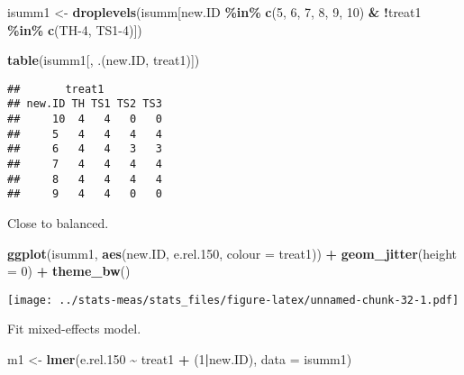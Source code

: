 \documentclass[
]{article}
\newenvironment{Shaded}{\begin{snugshade}}{\end{snugshade}}
\newcommand{\AttributeTok}[1]{\textcolor[rgb]{0.13,0.29,0.53}{#1}}
\newcommand{\DecValTok}[1]{\textcolor[rgb]{0.00,0.00,0.81}{#1}}
\newcommand{\FloatTok}[1]{\textcolor[rgb]{0.00,0.00,0.81}{#1}}
\newcommand{\FunctionTok}[1]{\textcolor[rgb]{0.13,0.29,0.53}{\textbf{#1}}}
\newcommand{\NormalTok}[1]{#1}
\newcommand{\OtherTok}[1]{\textcolor[rgb]{0.56,0.35,0.01}{#1}}
\newcommand{\SpecialCharTok}[1]{\textcolor[rgb]{0.81,0.36,0.00}{\textbf{#1}}}
\newcommand{\StringTok}[1]{\textcolor[rgb]{0.31,0.60,0.02}{#1}}
\begin{document}
\begin{Shaded}
\begin{Highlighting}[]
\NormalTok{isumm1 }\OtherTok{\textless{}{-}} \FunctionTok{droplevels}\NormalTok{(isumm[new.ID }\SpecialCharTok{\%in\%} \FunctionTok{c}\NormalTok{(}\StringTok{\textquotesingle{}5\textquotesingle{}}\NormalTok{, }\StringTok{\textquotesingle{}6\textquotesingle{}}\NormalTok{, }\StringTok{\textquotesingle{}7\textquotesingle{}}\NormalTok{, }\StringTok{\textquotesingle{}8\textquotesingle{}}\NormalTok{, }\StringTok{\textquotesingle{}9\textquotesingle{}}\NormalTok{, }\StringTok{\textquotesingle{}10\textquotesingle{}}\NormalTok{) }\SpecialCharTok{\&} \SpecialCharTok{!}\NormalTok{treat1 }\SpecialCharTok{\%in\%} \FunctionTok{c}\NormalTok{(}\StringTok{\textquotesingle{}TH{-}4\textquotesingle{}}\NormalTok{, }\StringTok{\textquotesingle{}TS1{-}4\textquotesingle{}}\NormalTok{)])}
\end{Highlighting}
\end{Shaded}

\begin{Shaded}
\begin{Highlighting}[]
\FunctionTok{table}\NormalTok{(isumm1[, .(new.ID, treat1)])}
\end{Highlighting}
\end{Shaded}

\begin{verbatim}
##       treat1
## new.ID TH TS1 TS2 TS3
##     10  4   4   0   0
##     5   4   4   4   4
##     6   4   4   3   3
##     7   4   4   4   4
##     8   4   4   4   4
##     9   4   4   0   0
\end{verbatim}

Close to balanced.

\begin{Shaded}
\begin{Highlighting}[]
\FunctionTok{ggplot}\NormalTok{(isumm1, }\FunctionTok{aes}\NormalTok{(new.ID, e.rel}\FloatTok{.150}\NormalTok{, }\AttributeTok{colour =}\NormalTok{ treat1)) }\SpecialCharTok{+}
  \FunctionTok{geom\_jitter}\NormalTok{(}\AttributeTok{height =} \DecValTok{0}\NormalTok{) }\SpecialCharTok{+}
  \FunctionTok{theme\_bw}\NormalTok{()}
\end{Highlighting}
\end{Shaded}

\texttt{[image: ../stats-meas/stats\_files/figure-latex/unnamed-chunk-32-1.pdf]}

Fit mixed-effects model.

\begin{Shaded}
\begin{Highlighting}[]
\NormalTok{m1 }\OtherTok{\textless{}{-}} \FunctionTok{lmer}\NormalTok{(e.rel}\FloatTok{.150} \SpecialCharTok{\textasciitilde{}}\NormalTok{ treat1 }\SpecialCharTok{+}\NormalTok{ (}\DecValTok{1}\SpecialCharTok{|}\NormalTok{new.ID), }\AttributeTok{data =}\NormalTok{ isumm1)}
\end{Highlighting}
\end{Shaded}
\end{document}
